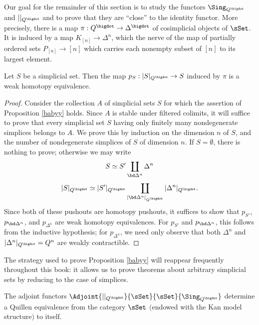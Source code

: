 Our goal for the remainder of this section is to study the functors
$\Sing_{Q^{\bigdot}}$ and $||_{Q^{\bigdot}}$ and to prove
that they are ``close'' to the identity functor. More precisely, there is a map $\pi: Q^{\bigdot} \rightarrow \Delta^{\bigdot}$ of
cosimplicial objects of $\sSet$. It is induced by a map $K_{[n]}
\rightarrow \Delta^n$, which the nerve of the map of partially ordered sets
$P_{[n]} \rightarrow [n]$ which carries each nonempty subset of
$[n]$ to its largest element.

\begin{proposition}\label{babyy}
Let $S$ be a simplicial set. Then the map $p_S: |S|_{Q^{\bigdot}}
\rightarrow S$ induced by $\pi$ is a weak homotopy equivalence.
\end{proposition}

\begin{proof}
Consider the collection $A$ of simplicial sets $S$ for which the assertion of Proposition \ref{babyy} holds. 
Since $A$ is stable under filtered colimits, it will suffice to prove that every simplicial set $S$ having only finitely many nondegenerate simplices belongs to $A$. We prove this by induction on the dimension $n$ of $S$, and the number of nondegenerate simplices of $S$ of dimension $n$. If $S = \emptyset$, there is nothing to prove; otherwise we may write
$$S \simeq S' \coprod_{ \bd \Delta^n } \Delta^n $$
$$ |S|_{Q^{\bigdot}} \simeq |S'|_{Q^{\bigdot}} \coprod_{ |\bd \Delta^n|_{Q^{\bigdot}} } |\Delta^n|_{Q^{\bigdot}}.$$
Since both of these pushouts are homotopy pushouts, it suffices to show that $p_{S'}$, $p_{\bd \Delta^n}$, and $p_{\Delta^n}$ are weak homotopy equivalences. For $p_{S'}$ and $p_{\bd \Delta^n}$, this follows from the inductive hypothesis; for $p_{\Delta^n}$, we need only observe that both $\Delta^n$ and $|\Delta^n|_{Q^{\bigdot}} = Q^n$ are weakly contractible.
\end{proof}

\begin{remark}
The strategy used to prove Proposition \ref{babyy} will reappear frequently throughout this book: it allows us to prove theorems about arbitrary simplicial sets by reducing to the case of simplices.
\end{remark}

\begin{proposition}\label{realremmy}
The adjoint functors
$\Adjoint{ | |_{Q^{\bigdot}}}{\sSet}{\sSet}{ \Sing_{Q^{\bigdot} } }$
determine a Quillen equivalence from the category $\sSet$
$($endowed with the Kan model structure$)$ to itself.
\end{proposition}

